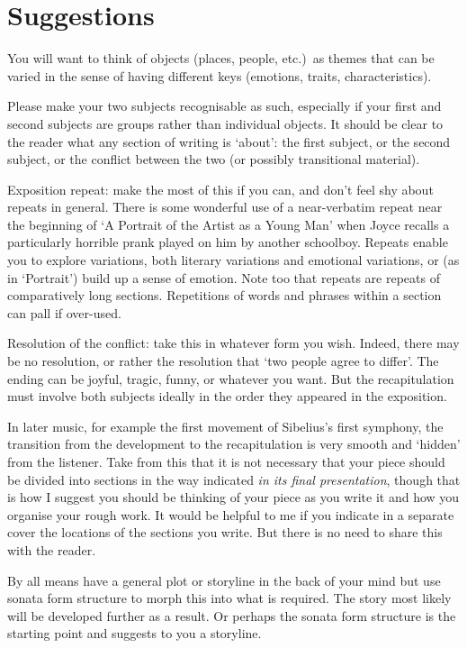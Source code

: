 \documentclass[a4paper]{article}
\begin{document}
\clearpage

\section{Suggestions}

You will want to think of objects (places, people, etc.)~as
themes that can be varied
in the sense of having different keys (emotions, traits, characteristics).

Please make your two subjects recognisable as such, especially if your
first and second subjects are groups rather than individual objects.
It should be clear to the reader what any section of writing is
`about': the first subject, or the second subject, or the conflict
between the two (or possibly transitional material).

Exposition repeat: make the most of this if you can, and
don't feel shy about repeats in general.  There is
some wonderful use of a near-verbatim repeat near the beginning of
`A Portrait of the Artist as a Young Man' when Joyce recalls a
particularly horrible prank played on him by another schoolboy.
Repeats enable you to explore variations, both literary variations
and emotional variations, or (as in `Portrait') build up a sense
of emotion.  Note too that repeats are repeats of comparatively long
sections.  Repetitions of words and phrases within a section
can pall if over-used.

Resolution of the conflict:  take this in whatever form you
wish.
Indeed, there may be no resolution, or rather the resolution
that `two people agree to differ'.  The ending can be joyful, tragic,
funny, or whatever you want.
But the recapitulation must involve both subjects ideally
in the order they appeared in the exposition.

In later music, for example the first movement of Sibelius's first
symphony, the transition from the development to the recapitulation is
very smooth and `hidden' from the listener. Take from this that it is
not necessary that your piece should be divided into sections in the
way indicated \textit{in its final presentation}, though that is how I suggest
you should be thinking of your piece as you write it and how you
organise your rough work.  It would be helpful to me if you indicate
in a separate cover the locations of the sections you write.  But there
is no need to share this with the reader.

By all means have a general plot or storyline in the back of your mind
but use sonata form structure to morph this into what is required.
The story most likely will be developed further as a result.
Or perhaps the sonata form structure is the starting point and suggests
to you a storyline.
\end{document}
